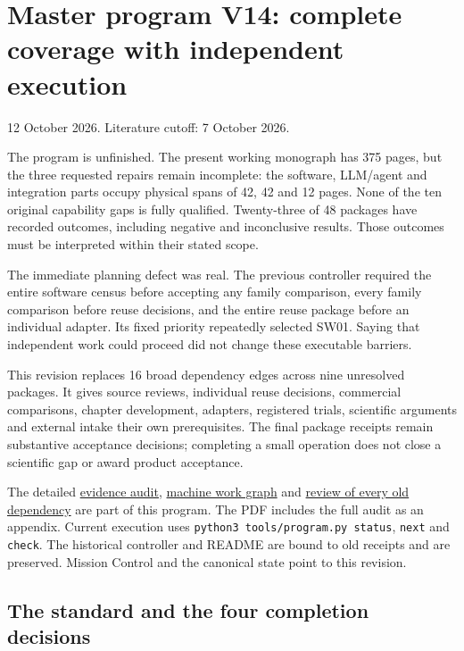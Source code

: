 \documentclass[
  10pt,
]{article}
\author{}
\date{}
\begin{document}
\hypertarget{master-program-v14-complete-coverage-with-independent-execution}{%
\section{Master program V14: complete coverage with independent
execution}\label{master-program-v14-complete-coverage-with-independent-execution}}

12 October 2026. Literature cutoff: 7 October 2026.

The program is unfinished. The present working monograph has 375 pages,
but the three requested repairs remain incomplete: the software,
LLM/agent and integration parts occupy physical spans of 42, 42 and 12
pages. None of the ten original capability gaps is fully qualified.
Twenty-three of 48 packages have recorded outcomes, including negative
and inconclusive results. Those outcomes must be interpreted within
their stated scope.

The immediate planning defect was real. The previous controller required
the entire software census before accepting any family comparison, every
family comparison before reuse decisions, and the entire reuse package
before an individual adapter. Its fixed priority repeatedly selected
SW01. Saying that independent work could proceed did not change these
executable barriers.

This revision replaces 16 broad dependency edges across nine unresolved
packages. It gives source reviews, individual reuse decisions,
commercial comparisons, chapter development, adapters, registered
trials, scientific arguments and external intake their own
prerequisites. The final package receipts remain substantive acceptance
decisions; completing a small operation does not close a scientific gap
or award product acceptance.

The detailed \href{comprehensive-v14/gap-audit.md}{evidence audit},
\href{comprehensive-v14/work-graph.json}{machine work graph} and
\href{comprehensive-v14/dependency-review.json}{review of every old
dependency} are part of this program. The PDF includes the full audit as
an appendix. Current execution uses
\texttt{python3\ tools/program.py\ status}, \texttt{next} and
\texttt{check}. The historical controller and README are bound to old
receipts and are preserved. Mission Control and the canonical state
point to this revision.

\hypertarget{the-standard-and-the-four-completion-decisions}{%
\subsection{The standard and the four completion
decisions}\label{the-standard-and-the-four-completion-decisions}}
\end{document}
